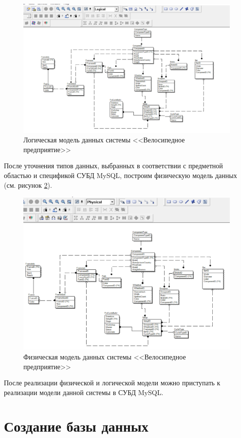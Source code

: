 \documentclass[a4paper,14pt]{extarticle}
\begin{document}
\begin{figure}[h!]
	\centering
	\includegraphics[width=0.8\linewidth]{images/2-cycle-logical}
	\caption{Логическая модель данных системы <<Велосипедное предприятие>>}
	\label{fig:2-cycle-logical}
\end{figure}

После уточнения типов данных, выбранных в соответствии с предметной областью и спецификой СУБД MySQL, построим физическую модель данных (см. рисунок \ref{fig:2-cycle-phisical}).

\begin{figure}[h!]
	\centering
	\includegraphics[width=0.8\linewidth]{images/2-cycle-phisical}
	\caption{Физическая модель данных системы <<Велосипедное предприятие>>}
	\label{fig:2-cycle-phisical}
\end{figure}

После реализации физической и логической модели можно приступать к реализации модели данной системы в СУБД MySQL.


\section{Создание базы данных}
\end{document}
